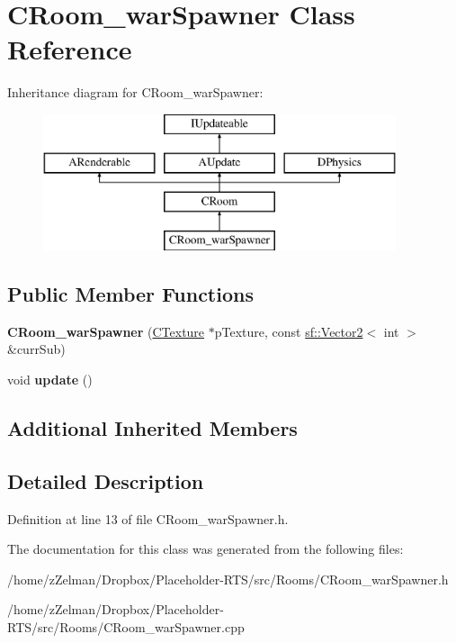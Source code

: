 \hypertarget{classCRoom__warSpawner}{\section{C\-Room\-\_\-war\-Spawner Class Reference}
\label{classCRoom__warSpawner}
}
Inheritance diagram for C\-Room\-\_\-war\-Spawner\-:\begin{figure}[H]
\begin{center}
\leavevmode
\includegraphics[height=4.000000cm]{classCRoom__warSpawner}
\end{center}
\end{figure}
\subsection*{Public Member Functions}
\begin{DoxyCompactItemize}
\item 
\hypertarget{classCRoom__warSpawner_ac5c593c176b3644c4e0240e31281e6c9}{{\bfseries C\-Room\-\_\-war\-Spawner} (\hyperlink{classCTexture}{C\-Texture} $\ast$p\-Texture, const \hyperlink{classsf_1_1Vector2}{sf\-::\-Vector2}$<$ int $>$ \&curr\-Sub)}\label{classCRoom__warSpawner_ac5c593c176b3644c4e0240e31281e6c9}

\item 
\hypertarget{classCRoom__warSpawner_a67388a7401fddf2655945364dc42f837}{void {\bfseries update} ()}\label{classCRoom__warSpawner_a67388a7401fddf2655945364dc42f837}

\end{DoxyCompactItemize}
\subsection*{Additional Inherited Members}


\subsection{Detailed Description}


Definition at line 13 of file C\-Room\-\_\-war\-Spawner.\-h.



The documentation for this class was generated from the following files\-:\begin{DoxyCompactItemize}
\item 
/home/z\-Zelman/\-Dropbox/\-Placeholder-\/\-R\-T\-S/src/\-Rooms/C\-Room\-\_\-war\-Spawner.\-h\item 
/home/z\-Zelman/\-Dropbox/\-Placeholder-\/\-R\-T\-S/src/\-Rooms/C\-Room\-\_\-war\-Spawner.\-cpp\end{DoxyCompactItemize}

